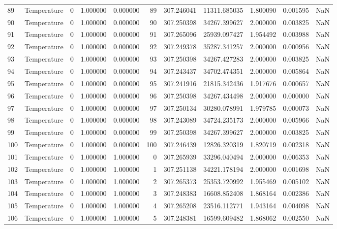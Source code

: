 \begin{tabular}{llrrrrrrrrr}
89 & Temperature & 0 & 1.000000 & 0.000000 & 89 & 307.246041 & 11311.685035 & 1.800090 & 0.001595 & NaN \\
90 & Temperature & 0 & 1.000000 & 0.000000 & 90 & 307.250398 & 34267.399627 & 2.000000 & 0.003825 & NaN \\
91 & Temperature & 0 & 1.000000 & 0.000000 & 91 & 307.265096 & 25939.097427 & 1.954492 & 0.003988 & NaN \\
92 & Temperature & 0 & 1.000000 & 0.000000 & 92 & 307.249378 & 35287.341257 & 2.000000 & 0.000956 & NaN \\
93 & Temperature & 0 & 1.000000 & 0.000000 & 93 & 307.250398 & 34267.427283 & 2.000000 & 0.003825 & NaN \\
94 & Temperature & 0 & 1.000000 & 0.000000 & 94 & 307.243437 & 34702.474351 & 2.000000 & 0.005864 & NaN \\
95 & Temperature & 0 & 1.000000 & 0.000000 & 95 & 307.241916 & 21815.342436 & 1.917676 & 0.000657 & NaN \\
96 & Temperature & 0 & 1.000000 & 0.000000 & 96 & 307.250398 & 34267.434498 & 2.000000 & 0.000000 & NaN \\
97 & Temperature & 0 & 1.000000 & 0.000000 & 97 & 307.250134 & 30280.078991 & 1.979785 & 0.000073 & NaN \\
98 & Temperature & 0 & 1.000000 & 0.000000 & 98 & 307.243089 & 34724.235173 & 2.000000 & 0.005966 & NaN \\
99 & Temperature & 0 & 1.000000 & 0.000000 & 99 & 307.250398 & 34267.399627 & 2.000000 & 0.003825 & NaN \\
100 & Temperature & 0 & 1.000000 & 0.000000 & 100 & 307.246439 & 12826.320319 & 1.820719 & 0.002318 & NaN \\
101 & Temperature & 0 & 1.000000 & 1.000000 & 0 & 307.265939 & 33296.040494 & 2.000000 & 0.006353 & NaN \\
102 & Temperature & 0 & 1.000000 & 1.000000 & 1 & 307.251138 & 34221.178194 & 2.000000 & 0.001698 & NaN \\
103 & Temperature & 0 & 1.000000 & 1.000000 & 2 & 307.265373 & 25353.720992 & 1.955469 & 0.005102 & NaN \\
104 & Temperature & 0 & 1.000000 & 1.000000 & 3 & 307.248383 & 16608.852408 & 1.868164 & 0.002386 & NaN \\
105 & Temperature & 0 & 1.000000 & 1.000000 & 4 & 307.265208 & 23516.112771 & 1.943164 & 0.004098 & NaN \\
106 & Temperature & 0 & 1.000000 & 1.000000 & 5 & 307.248381 & 16599.609482 & 1.868062 & 0.002550 & NaN \\

\end{tabular}
